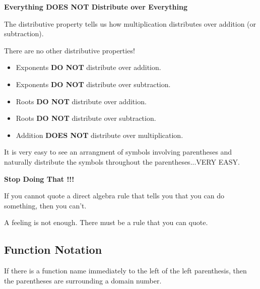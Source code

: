 \documentclass{ximera}
\begin{document}
\begin{warning} \textbf{\textcolor{red!70!black}{Everything DOES NOT Distribute over Everything}}

The distributive property tells us how multiplication distributes over addition (or subtraction). 


There are no other distributive properties! 

\begin{itemize}
    \item Exponents \textbf{\textcolor{red!70!black}{DO NOT}} distribute over addition.
    \item Exponents \textbf{\textcolor{red!70!black}{DO NOT}} distribute over subtraction.
    \item Roots \textbf{\textcolor{red!70!black}{DO NOT}} distribute over addition.
    \item Roots \textbf{\textcolor{red!70!black}{DO NOT}} distribute over subtraction.
    \item Addition \textbf{\textcolor{red!70!black}{DOES NOT}} distribute over multiplication.
\end{itemize}


It is very easy to see an arrangment of symbols involving parentheses and naturally distribute the symbols throughout the parentheses...VERY EASY. 

\begin{center}

\textbf{\textcolor{red!70!black}{Stop Doing That !!!}}

\end{center}



If you cannot quote a direct algebra rule that tells you that you can do something, then you can't.  

A feeling is not enough.  There must be a rule that you can quote.


\end{warning}













\subsection*{Function Notation}


If there is a function name immediately to the left of the left parenthesis, then the parentheses are surrounding a domain number.   
\end{document}
